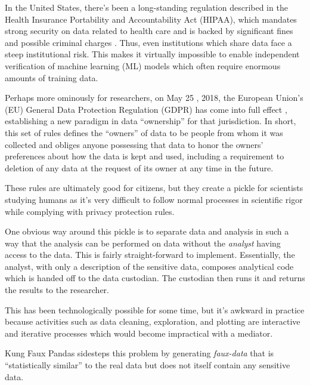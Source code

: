 \documentclass{article}
\begin{document}
In the United States, there's been a long-standing regulation described in the Health Insurance Portability and Accountability Act (HIPAA), which mandates strong security on data related to health care and is backed by significant fines and possible criminal charges \cite{hippaviol}.  Thus, even institutions which share data face a steep institutional risk. This makes it virtually impossible to enable independent verification of machine learning (ML) models which often require enormous amounts of training data.

Perhaps more ominously for researchers, on May 25 , 2018, the European Union's (EU) General Data Protection Regulation (GDPR) has come into full effect \cite{gdpr}, establishing a new paradigm in data ``ownership'' for that jurisdiction.   In short, this set of rules defines the ``owners'' of data to be people from whom it was collected and obliges anyone possessing  that data to  honor the owners' preferences about how the data is kept and used, including a requirement to deletion of any data at the request of its owner at any time in the future.

These rules are ultimately good for citizens, but they create a pickle for scientists studying humans as it's very difficult to follow normal processes in scientific rigor while complying with privacy protection rules.

One obvious way around this pickle is to separate data and analysis in such a way that the analysis can be performed on data without the \emph{analyst} having access to the data.   This is fairly straight-forward to implement.   Essentially, the analyst, with only a description of the sensitive data, composes analytical code which is handed off to the data custodian.  The custodian then runs it and returns the results to the researcher.

This has been technologically possible for some time, but it's awkward in practice because activities such as data cleaning, exploration, and plotting are interactive and iterative processes which would become impractical with a mediator.

Kung Faux Pandas sidesteps this problem by generating \emph{faux-data} that is ``statistically similar'' to the real data but does not itself contain any sensitive data.
\end{document}
